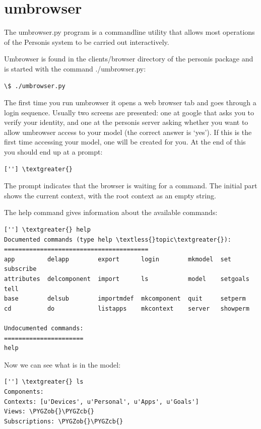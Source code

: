 \documentclass[letterpaper,10pt,english]{sphinxmanual}
\def\PYGZob{\char`\{}
\def\PYGZcb{\char`\}}
\begin{document}
\section{umbrowser}
\label{Tutorial:umbrowser}
The umbrowser.py program is a commandline utility that allows most
operations of the Personis system to be carried out interactively.

Umbrowser is found in the clients/browser directory of the personis package and is started with
the command ./umbrowser.py:

\begin{Verbatim}[commandchars=\\\{\}]
\$ ./umbrowser.py
\end{Verbatim}

The first time you run umbrowser it opens a web browser tab and goes through a login sequence. Usually two screens are presented: one at google that asks you to verify your identity, and one at the personis server asking whether you want to allow umbrowser access to your model (the correct answer is `yes'). If this is the first time accessing your model, one will be created for you. At the end of this you should end up at a prompt:

\begin{Verbatim}[commandchars=\\\{\}]
[''] \textgreater{}
\end{Verbatim}

The prompt indicates that the browser is waiting for a command. The
initial part shows the current context, with the root context as an
empty string.

The help command gives information about the available commands:

\begin{Verbatim}[commandchars=\\\{\}]
[''] \textgreater{} help
Documented commands (type help \textless{}topic\textgreater{}):
========================================
app         delapp        export      login        mkmodel  set       subscribe
attributes  delcomponent  import      ls           model    setgoals  tell
base        delsub        importmdef  mkcomponent  quit     setperm
cd          do            listapps    mkcontext    server   showperm

Undocumented commands:
======================
help
\end{Verbatim}

Now we can see what is in the model:

\begin{Verbatim}[commandchars=\\\{\}]
[''] \textgreater{} ls
Components:
Contexts: [u'Devices', u'Personal', u'Apps', u'Goals']
Views: \PYGZob{}\PYGZcb{}
Subscriptions: \PYGZob{}\PYGZcb{}
\end{Verbatim}
\end{document}
